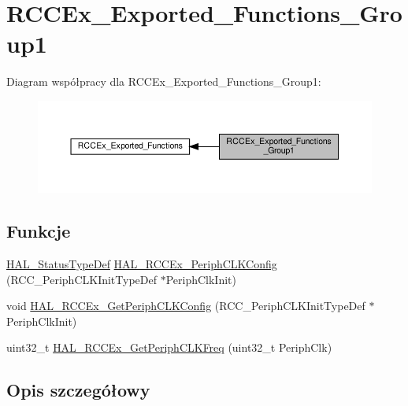 \hypertarget{group___r_c_c_ex___exported___functions___group1}{}\section{R\+C\+C\+Ex\+\_\+\+Exported\+\_\+\+Functions\+\_\+\+Group1}
\label{group___r_c_c_ex___exported___functions___group1}
Diagram współpracy dla R\+C\+C\+Ex\+\_\+\+Exported\+\_\+\+Functions\+\_\+\+Group1\+:\nopagebreak
\begin{figure}[H]
\begin{center}
\leavevmode
\includegraphics[width=350pt]{group___r_c_c_ex___exported___functions___group1}
\end{center}
\end{figure}
\subsection*{Funkcje}
\begin{DoxyCompactItemize}
\item 
\hyperlink{stm32f4xx__hal__def_8h_a63c0679d1cb8b8c684fbb0632743478f}{H\+A\+L\+\_\+\+Status\+Type\+Def} \hyperlink{group___r_c_c_ex___exported___functions___group1_ga0c0f61a1e2f47cc81bc43d83ba3e0d95}{H\+A\+L\+\_\+\+R\+C\+C\+Ex\+\_\+\+Periph\+C\+L\+K\+Config} (R\+C\+C\+\_\+\+Periph\+C\+L\+K\+Init\+Type\+Def $\ast$Periph\+Clk\+Init)
\item 
void \hyperlink{group___r_c_c_ex___exported___functions___group1_ga754fc5136c63ad52b7c459aafc8a3927}{H\+A\+L\+\_\+\+R\+C\+C\+Ex\+\_\+\+Get\+Periph\+C\+L\+K\+Config} (R\+C\+C\+\_\+\+Periph\+C\+L\+K\+Init\+Type\+Def $\ast$Periph\+Clk\+Init)
\item 
uint32\+\_\+t \hyperlink{group___r_c_c_ex___exported___functions___group1_ga14acaeb88163a6bb0839470b753ba1bd}{H\+A\+L\+\_\+\+R\+C\+C\+Ex\+\_\+\+Get\+Periph\+C\+L\+K\+Freq} (uint32\+\_\+t Periph\+Clk)
\end{DoxyCompactItemize}


\subsection{Opis szczegółowy}


